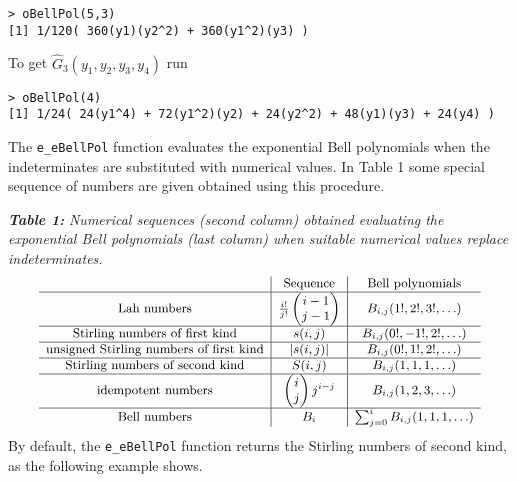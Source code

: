 \begin{verbatim}
> oBellPol(5,3)
[1] 1/120( 360(y1)(y2^2) + 360(y1^2)(y3) )
\end{verbatim}

\noindent To get \(\hat{G}_3(y_1, y_2, y_3, y_4)\) run

\begin{verbatim}
> oBellPol(4)
[1] 1/24( 24(y1^4) + 72(y1^2)(y2) + 24(y2^2) + 48(y1)(y3) + 24(y4) )
\end{verbatim}

The \texttt{e\_eBellPol} function evaluates the exponential Bell polynomials when the indeterminates are substituted with numerical values. In Table 1 some special sequence of numbers are given obtained using this procedure.

\textbf{\emph{Table 1:}} \emph{Numerical sequences (second column) obtained evaluating the exponential Bell polynomials (last column) when suitable numerical values replace indeterminates.}
\[{\small \begin{array}{c|c|c} 
                           \hbox{ }              & \hbox{Sequence}                 &  \hbox{Bell polynomials} \\  \hline 
\hbox{Lah numbers}                             & \frac{i!}{j!} \begin{pmatrix}
i-1 \\j-1
\end{pmatrix} & B_{i,j} (1!, 2!, 3!, \ldots) \\ \hline 
\hbox{Stirling numbers of first kind}          & s(i,j)                          & B_{i,j} (0!, -1!, 2!, \ldots) \\ \hline  
\hbox{unsigned Stirling numbers of first kind} & |s(i,j)|                        & B_{i,j} (0!, 1!, 2!, \ldots) \\ \hline 
\hbox{Stirling numbers of second kind}         & S(i,j)                          & B_{i,j} (1, 1, 1, \ldots) \\ \hline 
\hbox{idempotent numbers}                      & \begin{pmatrix}
i \\j
\end{pmatrix} j^{i-j}           & B_{i,j} (1, 2, 3, \ldots) \\ \hline 
\hbox{Bell numbers}                            & B_i                             & \sum_{j=0}^i B_{i,j} (1, 1, 1, \ldots)
\end{array}}\]
By default, the \texttt{e\_eBellPol} function returns the Stirling numbers of second kind, as the following example shows.

